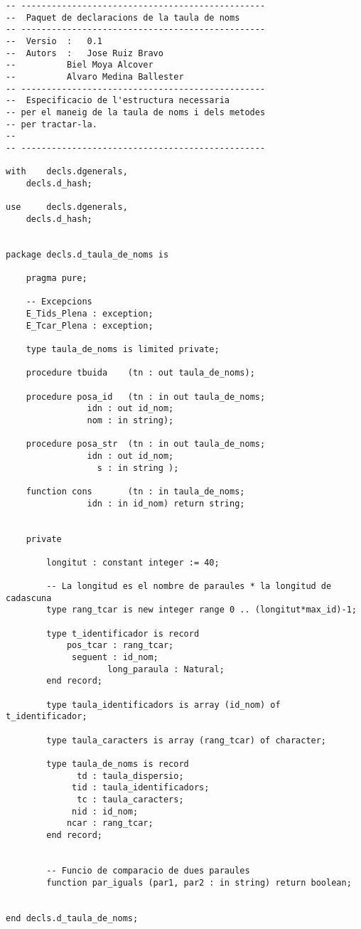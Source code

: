 \documentclass[10pt]{article}
\begin{document}
	\begin{lstlisting}[style=Ada]
-- ------------------------------------------------
--  Paquet de declaracions de la taula de noms
-- ------------------------------------------------
--  Versio	:	0.1
--  Autors	:	Jose Ruiz Bravo
--			Biel Moya Alcover
--			Alvaro Medina Ballester
-- ------------------------------------------------
--	Especificacio de l'estructura necessaria
-- per el maneig de la taula de noms i dels metodes
-- per tractar-la.
--
-- ------------------------------------------------

with 	decls.dgenerals,
	decls.d_hash; 
	
use 	decls.dgenerals,
	decls.d_hash;


package decls.d_taula_de_noms is

	pragma pure;

	-- Excepcions
	E_Tids_Plena : exception;
	E_Tcar_Plena : exception;

	type taula_de_noms is limited private;

	procedure tbuida	(tn : out taula_de_noms);

	procedure posa_id 	(tn : in out taula_de_noms;  
				idn : out id_nom; 
				nom : in string);

	procedure posa_str	(tn : in out taula_de_noms;
				idn : out id_nom;
				  s : in string );
					
	function cons		(tn : in taula_de_noms; 
				idn : in id_nom) return string;
							

	private
	
		longitut : constant integer := 40;
	
		-- La longitud es el nombre de paraules * la longitud de cadascuna
		type rang_tcar is new integer range 0 .. (longitut*max_id)-1;
	
		type t_identificador is record 
			pos_tcar : rang_tcar;
			 seguent : id_nom;	  	
                    long_paraula : Natural;
		end record;
	
		type taula_identificadors is array (id_nom) of t_identificador;
	
		type taula_caracters is array (rang_tcar) of character; 
	
		type taula_de_noms is record
			  td : taula_dispersio;
			 tid : taula_identificadors;
			  tc : taula_caracters;
			 nid : id_nom;
			ncar : rang_tcar;
		end record;
	
	
		-- Funcio de comparacio de dues paraules
		function par_iguals (par1, par2 : in string) return boolean;		
				
		
end decls.d_taula_de_noms;		
	\end{lstlisting}
		
		
\end{document}
